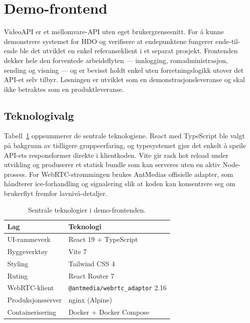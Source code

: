 \section{Demo-frontend}
\label{sec:demo-frontend}

VideoAPI er et mellomvare-API uten eget brukergrensesnitt. For å kunne
demonstrere systemet for HDO og verifisere at endepunktene fungerer
ende-til-ende ble det utviklet en enkel referanseklient i et separat prosjekt.
Frontenden dekker hele den forventede arbeidsflyten --- innlogging,
romadministrasjon, sending og visning --- og er bevisst holdt enkel uten
forretningslogikk utover det API-et selv tilbyr. Løsningen er utviklet som en demonstrasjonsleveranse og skal ikke betraktes som en produktleveranse.

\subsection{Teknologivalg}
\label{subsec:demo-tech}

Tabell~\ref{tab:frontend-tech} oppsummerer de sentrale teknologiene.
React med TypeScript ble valgt på bakgrunn av tidligere gruppeerfaring, og
typesystemet gjør det enkelt å speile API-ets responsformer direkte i
klientkoden. Vite gir rask hot reload under utvikling og produserer et statisk
bundle som kan serveres uten en aktiv Node-prosess. For WebRTC-strømmingen
brukes AntMedias offisielle adapter, som håndterer \gls{ice}-forhandling og
signalering slik at koden kan konsentrere seg om brukerflyt fremfor
lavnivå-detaljer.

\begin{table}[H]
\centering
\caption{Sentrale teknologier i demo-frontenden.}
\label{tab:frontend-tech}
\begin{tabular}{l l}
\toprule
\textbf{Lag} & \textbf{Teknologi} \\
\midrule
UI-rammeverk        & React 19 + TypeScript \\
Byggeverktøy        & Vite 7 \\
Styling             & Tailwind CSS 4 \\
Ruting              & React Router 7 \\
WebRTC-klient       & \texttt{@antmedia/webrtc\_adaptor} 2.16 \\
Produksjonsserver   & nginx (Alpine) \\
Containerisering    & Docker + Docker Compose \\
\bottomrule
\end{tabular}
\end{table}

